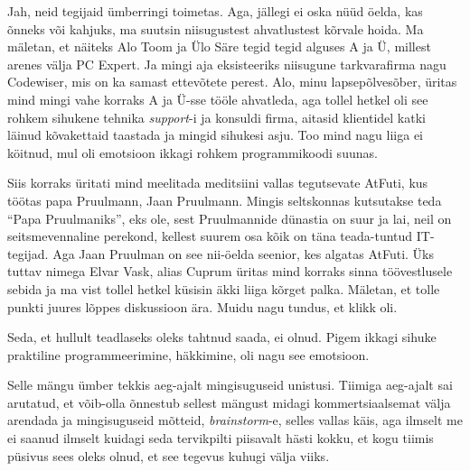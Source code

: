 Jah, neid tegijaid ümberringi toimetas. Aga, jällegi ei oska nüüd öelda, kas 
õnneks või kahjuks, ma suutsin niisugustest ahvatlustest  kõrvale hoida. Ma 
mäletan, et näiteks Alo Toom ja Ülo Säre tegid tegid alguses A ja Ü, millest arenes välja PC 
Expert.  Ja mingi aja eksisteeriks niisugune tarkvarafirma 
nagu Codewiser, mis on ka samast  ettevõtete perest. Alo, minu 
 lapsepõlvesõber, üritas mind mingi vahe korraks A ja Ü-sse tööle ahvatleda, 
aga tollel hetkel  oli see rohkem sihukene tehnika \emph{support}-i ja konsuldi 
firma, aitasid klientidel katki läinud kõvakettaid taastada ja mingid sihukesi 
asju. Too mind nagu liiga ei köitnud, mul  oli emotsioon  ikkagi rohkem  
programmikoodi suunas. 

Siis korraks üritati mind meelitada meditsiini vallas tegutsevate 
AtFuti, kus töötas papa Pruulmann, Jaan 
Pruulmann. Mingis seltskonnas kutsutakse teda 
\enquote{Papa  Pruulmaniks}, eks ole, sest Pruulmannide dünastia on suur ja 
lai, neil on seitsmevennaline perekond, kellest suurem osa kõik on täna 
teada-tuntud IT-tegijad. Aga Jaan Pruulman on  see nii-öelda seenior, kes 
algatas AtFuti. Üks tuttav nimega Elvar Vask, alias 
Cuprum üritas mind korraks sinna 
töövestlusele sebida ja ma vist tollel hetkel küsisin  äkki liiga kõrget 
palka. Mäletan, et tolle punkti juures lõppes diskussioon ära. Muidu nagu 
tundus, et klikk oli. 


Seda, et hullult teadlaseks oleks tahtnud saada, ei olnud. Pigem ikkagi sihuke  
praktiline programmeerimine, häkkimine, oli nagu see emotsioon. 


Selle mängu ümber tekkis aeg-ajalt mingisuguseid unistusi. Tiimiga aeg-ajalt 
sai arutatud, et võib-olla õnnestub sellest mängust midagi kommertsiaalsemat 
välja arendada ja mingisuguseid mõtteid, \emph{brainstorm}-e, selles vallas käis, 
aga ilmselt me ei saanud ilmselt kuidagi seda tervikpilti piisavalt hästi 
kokku, et kogu tiimis püsivus sees oleks olnud, et see tegevus kuhugi välja 
viiks. 

